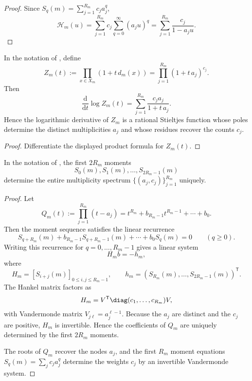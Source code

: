 \begin{proof}
Since
\(S_q(m)=\sum_{j=1}^{R_m} c_j a_j^q\),
\[
  \mathcal H_m(u)
  =
  \sum_{j=1}^{R_m} c_j \sum_{q=0}^{\infty}(a_ju)^q
  =
  \sum_{j=1}^{R_m}\frac{c_j}{1-a_ju}.
\]
\end{proof}

\begin{corollary}
\label{cor:stieltjes-log-derivative}
In the notation of , define
\[
  Z_m(t):=\prod_{x\in X_m}(1+t\,d_m(x))
  =\prod_{j=1}^{R_m}(1+t\,a_j)^{c_j}.
\]
Then
\[
  \frac{\mathrm{d}}{\mathrm{d}t}\log Z_m(t)
  =
  \sum_{j=1}^{R_m}\frac{c_j a_j}{1+t\,a_j}.
\]
Hence the logarithmic derivative of \(Z_m\) is a rational Stieltjes function
whose poles determine the distinct multiplicities \(a_j\) and whose residues
recover the counts \(c_j\).
\end{corollary}

\begin{proof}
Differentiate the displayed product formula for \(Z_m(t)\).
\end{proof}

\begin{theorem}
\label{thm:fiber-reconstruction}
In the notation of , the first \(2R_m\) moments
\[
  S_0(m),S_1(m),\dots,S_{2R_m-1}(m)
\]
determine the entire multiplicity spectrum
\(\{(a_j,c_j)\}_{j=1}^{R_m}\) uniquely.
\end{theorem}

\begin{proof}
Let
\[
  Q_m(t):=\prod_{j=1}^{R_m}(t-a_j)
  =t^{R_m}+b_{R_m-1}t^{R_m-1}+\cdots+b_0.
\]
Then the moment sequence satisfies the linear recurrence
\[
  S_{q+R_m}(m)+b_{R_m-1}S_{q+R_m-1}(m)+\cdots+b_0S_q(m)=0
  \qquad (q\ge 0).
\]
Writing this recurrence for \(q=0,\dots,R_m-1\) gives a linear system
\[
  H_m b=-h_m,
\]
where
\[
  H_m=[S_{i+j}(m)]_{0\le i,j\le R_m-1},
  \qquad
  h_m=(S_{R_m}(m),\dots,S_{2R_m-1}(m))^{\mathsf T}.
\]
The Hankel matrix factors as
\[
  H_m=V^{\mathsf T}\diag(c_1,\dots,c_{R_m})V,
\]
with Vandermonde matrix \(V_{j\ell}=a_j^{\ell-1}\).  Because the \(a_j\) are
distinct and the \(c_j\) are positive, \(H_m\) is invertible.  Hence the
coefficients of \(Q_m\) are uniquely determined by the first \(2R_m\) moments.

The roots of \(Q_m\) recover the nodes \(a_j\), and the first \(R_m\) moment
equations \(S_q(m)=\sum_j c_j a_j^q\) determine the weights \(c_j\) by an
invertible Vandermonde system.
\end{proof}

